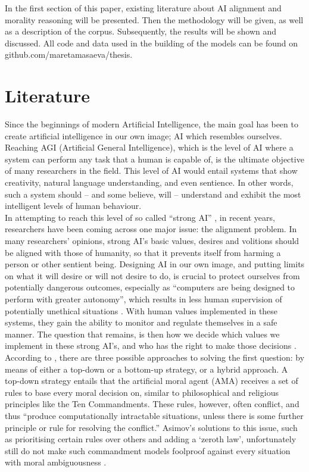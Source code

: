 \documentclass[final]{clv3} %
\begin{document}
In the first section of this paper, existing literature about AI alignment and morality reasoning will be presented. Then the methodology will be given, as well as a description of the corpus. Subsequently, the results will be shown and discussed. All code and data used in the building of the models can be found on github.com/maretamasaeva/thesis.

\section{Literature}

Since the beginnings of modern Artificial Intelligence, the main goal has been to create artificial intelligence in our own image; AI which resembles ourselves.  Reaching AGI (Artificial General Intelligence), which is the level of AI where a system can perform any task that a human is capable of, is the ultimate objective of many researchers in the field. This level of AI would entail systems that show creativity, natural language understanding, and even sentience. In other words, such a system should – and some believe, will – understand and exhibit the most intelligent levels of human behaviour. \\

In attempting to reach this level of so called “strong AI” \cite{chineseroom}, in recent years, researchers have been coming across one major issue: the alignment problem. In many researchers’ opinions, strong AI’s basic values, desires and volitions should be aligned with those of humanity, so that it prevents itself from harming a person or other sentient being. Designing AI in our own image, and putting limits on what it will desire or will not desire to do, is crucial to protect ourselves from potentially dangerous outcomes, especially as “computers are being designed to perform with greater autonomy”, which results in less human supervision of potentially unethical situations \cite[p. 149]{allen2005}. With human values implemented in these systems, they gain the ability to monitor and regulate themselves in a safe manner. The question that remains, is then how we decide which values we implement in these strong AI’s, and who has the right to make those decisions \cite{gabriel}. According to \citet{allen2005}, there are three possible approaches to solving the first question: by means of either a top-down or a bottom-up strategy, or a hybrid approach. A top-down strategy entails that the artificial moral agent (AMA) receives a set of rules to base every moral decision on, similar to philosophical and religious principles like the Ten Commandments. These rules, however, often conflict, and thus “produce computationally intractable situations, unless there is some further principle or rule for resolving the conflict.” \cite[p. 149]{allen2005} Asimov’s solutions to this issue, such as prioritising certain rules over others and adding a ‘zeroth law’, unfortunately still do not make such commandment models foolproof against every situation with moral ambiguousness \cite{allen2005}. \\
\end{document}
